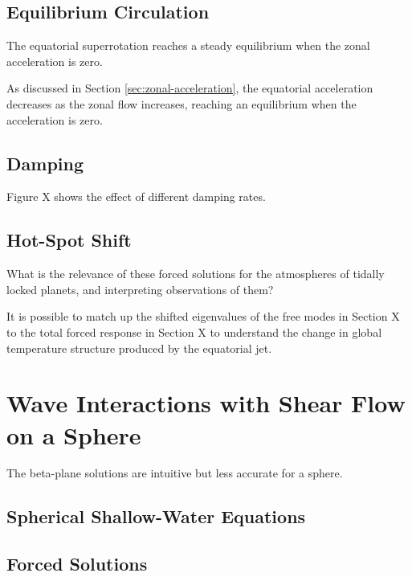 \subsection{Equilibrium Circulation}

The equatorial superrotation reaches a steady equilibrium when the zonal acceleration is zero.

As discussed in Section \ref{sec:zonal-acceleration}, the equatorial acceleration decreases as the zonal flow increases, reaching an equilibrium when the acceleration is zero.

\subsection{Damping}

Figure X shows the effect of different damping rates.

\subsection{Hot-Spot Shift}

What is the relevance of these forced solutions for the atmospheres of tidally locked planets, and interpreting observations of them?

It is possible to match up the shifted eigenvalues of the free modes in Section X to the total forced response in Section X to understand the change in global temperature structure produced by the equatorial jet.





\section{Wave Interactions with Shear Flow on a Sphere}

The beta-plane solutions are intuitive but less accurate for a sphere.



\subsection{Spherical Shallow-Water Equations}

\subsection{Forced Solutions}


